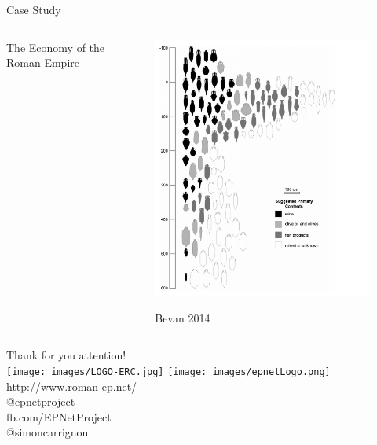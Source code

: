 \documentclass[12pt, notes=show]{beamer}
\begin{document}
\begin{frame}{Case Study}

    \begin{columns}
	\begin{column}{.35\textwidth}
	The Economy of the Roman Empire \\
	\end{column}
	\begin{column}{.6\textwidth}
	\begin{figure}
	    \includegraphics[width=\textwidth]{images/bevan.png}\\
	\caption{\scriptsize Bevan 2014}
	\end{figure}
	\end{column}
    \end{columns}
\end{frame}

\begin{frame}
	\begin{center}
		\Large
    Thank for you attention!\\
		\texttt{[image: images/LOGO-ERC.jpg]} \hfil	\texttt{[image: images/epnetLogo.png]}\\
		\vspace{1cm}
		\scriptsize
			http://www.roman-ep.net/\\
			@epnetproject\\
			fb.com/EPNetProject\\
			@simoncarrignon
	\end{center}


\end{frame}

\end{document}
